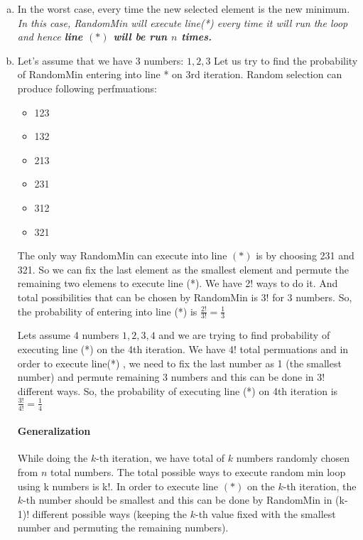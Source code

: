 

\begin{enumerate}[(a)]

	\item In the worst case, every time the new selected element is the new minimum. \emph{In this case, RandomMin will execute line(*) every time it will run the loop and hence \textbf{line $(*)$ will be run $n$ times.} } 
	
	
	\item 
	
	Let’s assume that we have 3 numbers: $1,2,3$
	Let us try to find the probability of RandomMin entering into line * on 3rd iteration.
	Random selection can produce following perfmuations:
	
	\begin{itemize}
	
		\item 123
		\item 132
		\item 213
		\item 231
		\item 312
		\item 321
		
	\end{itemize}
	
	The only way RandomMin can execute into line $(*)$ is by choosing 231 and 321. 
	So we can fix the last element as the smallest element and permute the remaining two elemens to execute line (*). 
	We have 2! ways to do it. And total possibilities that can be chosen by RandomMin is 3! for 3 numbers. 
	So, the probability of entering into line (*) is  $\frac{2!}{3!} = \frac{1}{3} $
	
	Lets assume 4 numbers $1, 2, 3, 4$ and we are trying to find probability of executing line (*) on the 4th iteration. 
	We have 4! total permuations and in order to execute line(*) , we need to fix the last number as 1 (the smallest number) and permute remaining 3 numbers and this can be done in 3! different ways. 
	So, the probability of executing line (*) on 4th iteration is $\frac{3!}{4!} = \frac{1}{4}$

	\paragraph{Generalization}
	
	While doing the $k$-th iteration, we have total of $k$ numbers randomly chosen from $n$ total numbers. 
	The total possible ways to execute random min loop using k numbers is k!. 
	In order to execute line $(*)$ on the $k$-th iteration, the $k$-th number should be smallest and this can be done by RandomMin in (k-1)! different possible ways (keeping the  $k$-th value fixed with the smallest number and permuting  the remaining numbers).


\end{enumerate}
